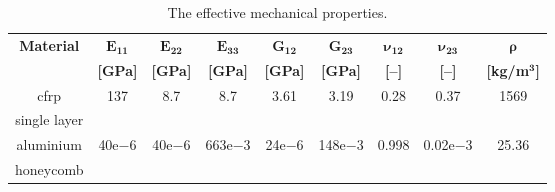 \begin{table}[H]
\small

\tabcolsep=0.25cm
\caption{\label{tab:properties_eff} The effective mechanical properties.}
\begin{tabular}{ccccccccc}
	\toprule
	\multirow{2}{*}{\textbf{Material}} & $\boldsymbol{E_{11}}$ & $\boldsymbol{E_{22}}$ & $\boldsymbol{E_{33}}$ & $\boldsymbol{G_{12}}$ & $\boldsymbol{G_{23}}$ & $\boldsymbol{\nu_{12}}$	& $\boldsymbol{\nu_{23}}$ & $\boldsymbol{\rho}$ \\
	& \textbf{[GPa]} & \textbf{[GPa]} & \textbf{[GPa]} & \textbf{[GPa]} & \textbf{[GPa]} & \textbf{[--]} & \textbf{[--]} & \textbf{[kg/m}$\boldsymbol{^3}$\textbf{]}\\
	\midrule
	\ac{cfrp} & 137 & 8.7 & 8.7 & 3.61 & 3.19 & 0.28 & 0.37 & 1569\\
	single layer & & & & & & & &\\ \midrule
	aluminium & 40e{$-$6} & 40e{$-$6} & 663e{$-$3} & 24e{$-$6} & 148e{$-$3} & 0.998 & 0.02e{$-$3} & 25.36\\
	honeycomb & & & & & & & &\\
	\bottomrule
\end{tabular}
\end{table}